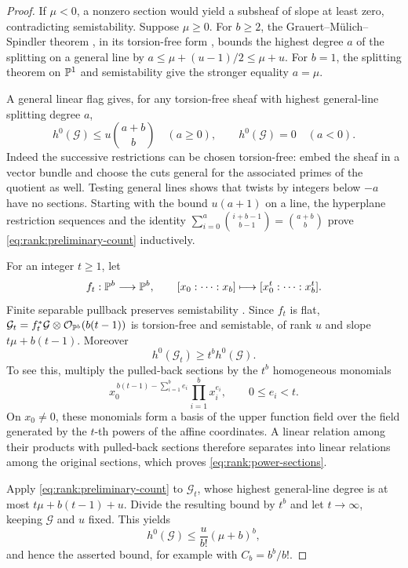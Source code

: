 \begin{proof}
If $\mu<0$, a nonzero section would yield a subsheaf of slope at least
zero, contradicting semistability.  Suppose $\mu\ge0$.
For $b\ge2$, the Grauert--M\"ulich--Spindler theorem
\cite{GrauertMulich1975,Spindler1979}, in its torsion-free form
\cite[Corollary~3.1.6]{HuybrechtsLehn2010}, bounds the highest degree $a$
of the splitting on a general line by $a\le\mu+(u-1)/2\le\mu+u$.
For $b=1$, the splitting theorem on $\mathbb P^1$ and
semistability give the stronger equality $a=\mu$.

A general linear flag gives, for any torsion-free sheaf with highest
general-line splitting degree $a$,
\begin{equation}\label{eq:rank:preliminary-count}
  h^0(\mathcal G)\le u{a+b\choose b}\quad(a\ge0),
  \qquad h^0(\mathcal G)=0\quad(a<0).
\end{equation}
Indeed the successive restrictions can be chosen torsion-free: embed
the sheaf in a vector bundle and choose the cuts general for the
associated primes of the quotient as well.  Testing general lines
shows that twists by integers below $-a$ have no sections.  Starting
with the bound $u(a+1)$ on a line, the hyperplane restriction sequences
and the identity
$\sum_{i=0}^a {i+b-1\choose b-1}={a+b\choose b}$ prove
\eqref{eq:rank:preliminary-count} inductively.

For an integer $t\ge1$, let
\[
  f_t:\mathbb P^b\longrightarrow\mathbb P^b,
  \qquad [x_0:\cdots:x_b]\longmapsto[x_0^t:\cdots:x_b^t].
\]
Finite separable pullback preserves semistability
\cite[Lemma~2.1]{Weissmann2024}.  Since $f_t$ is flat,
$\mathcal G_t=f_t^*\mathcal G\otimes\mathcal O_{\mathbb P^b}(b(t-1))$ is
torsion-free and semistable, of rank $u$ and slope
$t\mu+b(t-1)$.  Moreover
\begin{equation}\label{eq:rank:power-sections}
  h^0(\mathcal G_t)\ge t^b h^0(\mathcal G).
\end{equation}
To see this, multiply the pulled-back sections by the $t^b$ homogeneous
monomials
\[
  x_0^{\,b(t-1)-\sum_{i=1}^b e_i}
  \prod_{i=1}^b x_i^{e_i},\qquad 0\le e_i<t.
\]
On $x_0\ne0$, these monomials form a basis of the upper function field
over the field generated by the $t$-th powers of the affine coordinates.
A linear relation among their products with pulled-back sections
therefore separates into linear relations among the original sections,
which proves \eqref{eq:rank:power-sections}.

Apply \eqref{eq:rank:preliminary-count} to $\mathcal G_t$, whose highest
general-line degree is at most $t\mu+b(t-1)+u$.  Divide the resulting
bound by $t^b$ and let $t\to\infty$, keeping $\mathcal G$ and $u$ fixed.
This yields
\[
  h^0(\mathcal G)\le \frac{u}{b!}(\mu+b)^b,
\]
and hence the asserted bound, for example with $C_b=b^b/b!$.
\end{proof}

